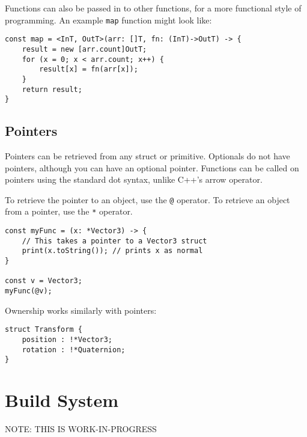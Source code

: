 \documentclass[12pt]{article}
\begin{document}
Functions can also be passed in to other functions, for a more functional style of programming. An example \lstinline!map! function might look like:

\begin{lstlisting}
const map = <InT, OutT>(arr: []T, fn: (InT)->OutT) -> {
	result = new [arr.count]OutT;
	for (x = 0; x < arr.count; x++) {
		result[x] = fn(arr[x]);
	}
	return result;
}
\end{lstlisting}

\subsection{Pointers}

Pointers can be retrieved from any struct or primitive. Optionals do not have pointers, although you can have an optional pointer. Functions can be called on pointers using the standard dot syntax, unlike C++'s arrow operator.

To retrieve the pointer to an object, use the \lstinline!@! operator. To retrieve an object from a pointer, use the \lstinline!*! operator.

\begin{lstlisting}
const myFunc = (x: *Vector3) -> {
	// This takes a pointer to a Vector3 struct
	print(x.toString()); // prints x as normal
}

const v = Vector3;
myFunc(@v);
\end{lstlisting}

Ownership works similarly with pointers:

\begin{lstlisting}
struct Transform {
	position : !*Vector3;
	rotation : !*Quaternion;
}
\end{lstlisting}

\section{Build System}

NOTE: THIS IS WORK-IN-PROGRESS
\end{document}
